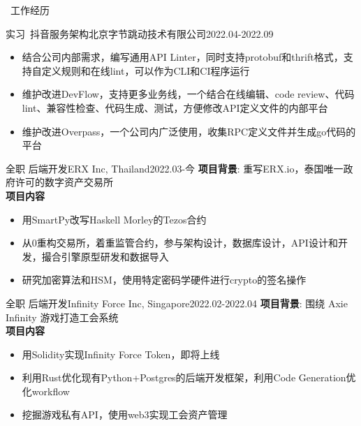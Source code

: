 \documentclass[UTF8]{resume}
\begin{document}
\begin{rSection}{\faBriefcase~工作经历}
    \begin{rExperience}{实习~抖音服务架构}{北京字节跳动技术有限公司}{2022.04-2022.09}
        \begin{itemize}
            \itemsep -0.5em \vspace{-0.5em}
            \item 结合公司内部需求，编写通用API Linter，同时支持protobuf和thrift格式，支持自定义规则和在线lint，可以作为CLI和CI程序运行
            \item 维护改进DevFlow，支持更多业务线，一个结合在线编辑、code review、代码lint、兼容性检查、代码生成、测试，方便修改API定义文件的内部平台
            \item 维护改进Overpass，一个公司内广泛使用，收集RPC定义文件并生成go代码的平台
        \end{itemize}
    \end{rExperience}
    \begin{rExperience}{全职 后端开发}{ERX Inc, Thailand}{2022.03-今}
        \textbf{项目背景}:
        重写ERX.io，泰国唯一政府许可的数字资产交易所\\
        \textbf{项目内容}
        \begin{itemize}
            \itemsep -0.5em \vspace{-0.5em}
            \item 用SmartPy改写Haskell Morley的Tezos合约
            \item 从0重构交易所，着重监管合约，参与架构设计，数据库设计，API设计和开发，撮合引擎原型研发和数据导入
            \item 研究加密算法和HSM，使用特定密码学硬件进行crypto的签名操作
        \end{itemize}
    \end{rExperience}
    \begin{rExperience}{全职 后端开发}{Infinity Force Inc, Singapore}{2022.02-2022.04}
        \textbf{项目背景}:
        围绕 Axie Infinity 游戏打造工会系统\\
        \textbf{项目内容}
        \begin{itemize}
            \itemsep -0.5em \vspace{-0.5em}
            \item 用Solidity实现Infinity Force Token，即将上线
            \item 利用Rust优化现有Python+Postgres的后端开发框架，利用Code Generation优化workflow
            \item 挖掘游戏私有API，使用web3实现工会资产管理

\end{itemize}
\end{rExperience}
\end{rSection}
\end{document}
